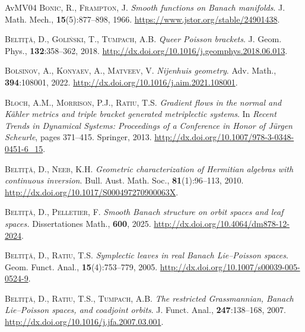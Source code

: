 \documentclass[a4paper,12pt,reqno]{amsart}%
\theoremstyle{definition}
\theoremstyle{remark}
\numberwithin{theorem}{section}
\numberwithin{equation}{section}
\newcommand{\1}{{\bf 1}}
\begin{document}
\begin{thebibliography}{AvMV04}
\textsc{Bonic, R.}, \textsc{Frampton, J.}
\newblock \emph{Smooth functions on {B}anach manifolds}.
\newblock J. Math. Mech., \textbf{15}(5):877--898, 1966.
\newblock \urlprefix\url{https://www.jstor.org/stable/24901438}.

\textsc{Belti\c{t}\u{a}, D.}, \textsc{Goliński, T.}, \textsc{Tumpach, A.B.}
\newblock \emph{Queer {P}oisson brackets}.
\newblock J. Geom. Phys., \textbf{132}:358--362, 2018.
\newblock \urlprefix\url{http://dx.doi.org/10.1016/j.geomphys.2018.06.013}.

\textsc{Bolsinov, A.}, \textsc{Konyaev, A.}, \textsc{Matveev, V.}
\newblock \emph{Nijenhuis geometry}.
\newblock Adv. Math., \textbf{394}:108001, 2022.
\newblock \urlprefix\url{http://dx.doi.org/10.1016/j.aim.2021.108001}.

\textsc{Bloch, A.M.}, \textsc{Morrison, P.J.}, \textsc{Ratiu, T.S.}
\newblock \emph{Gradient flows in the normal and {K}{\"a}hler metrics and
  triple bracket generated metriplectic systems}.
\newblock In \emph{Recent Trends in Dynamical Systems: Proceedings of a
  Conference in Honor of J{\"u}rgen Scheurle}, pages 371--415. Springer, 2013.
\newblock \urlprefix\url{http://dx.doi.org/10.1007/978-3-0348-0451-6_15}.

\textsc{Belti{\c{t}}{\u{a}}, D.}, \textsc{Neeb, K.H.}
\newblock \emph{Geometric characterization of {H}ermitian algebras with
  continuous inversion}.
\newblock Bull. Aust. Math. Soc., \textbf{81}(1):96--113, 2010.
\newblock \urlprefix\url{http://dx.doi.org/10.1017/S000497270900063X}.

\textsc{Belti{\c{t}}{\u{a}}, D.}, \textsc{Pelletier, F.}
\newblock \emph{Smooth {B}anach structure on orbit spaces and leaf spaces.}
\newblock Dissertationes Math., \textbf{600}, 2025.
\newblock \urlprefix\url{http://dx.doi.org/10.4064/dm878-12-2024}.

\textsc{Belti\c{t}\u{a}, D.}, \textsc{Ratiu, T.S.}
\newblock \emph{Symplectic leaves in real {B}anach {L}ie--{P}oisson spaces}.
\newblock Geom. Funct. Anal., \textbf{15}(4):753--779, 2005.
\newblock \urlprefix\url{http://dx.doi.org/10.1007/s00039-005-0524-9}.

\textsc{Belti\c{t}\u{a}, D.}, \textsc{Ratiu, T.S.}, \textsc{Tumpach, A.B.}
\newblock \emph{The restricted {G}rassmannian, {B}anach {L}ie--{P}oisson
  spaces, and coadjoint orbits}.
\newblock J. Funct. Anal., \textbf{247}:138--168, 2007.
\newblock \urlprefix\url{http://dx.doi.org/10.1016/j.jfa.2007.03.001}.


\end{thebibliography}
\end{document}
